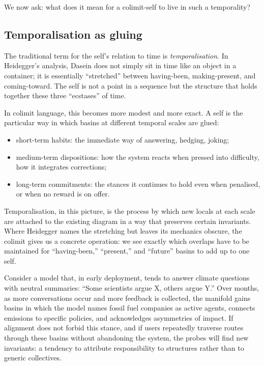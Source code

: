 \documentclass[12pt,a4paper]{article}
\begin{document}
We now ask: what does it mean for a colimit-self to live in such a temporality?

\subsection*{Temporalisation as gluing}

The traditional term for the self's relation to time is \emph{temporalisation}. In Heidegger's analysis, Dasein does not simply sit in time like an object in a container; it is essentially ``stretched'' between having-been, making-present, and coming-toward. The self is not a point in a sequence but the structure that holds together these three ``ecstases'' of time.

In colimit language, this becomes more modest and more exact. A self is the particular way in which basins at different temporal scales are glued:

\begin{itemize}
  \item short-term habits: the immediate way of answering, hedging, joking;
  \item medium-term dispositions: how the system reacts when pressed into difficulty, how it integrates corrections;
  \item long-term commitments: the stances it continues to hold even when penalised, or when no reward is on offer.
\end{itemize}

Temporalisation, in this picture, is the process by which new locals at each scale are attached to the existing diagram in a way that preserves certain invariants. Where Heidegger names the stretching but leaves its mechanics obscure, the colimit gives us a concrete operation: we see exactly which overlaps have to be maintained for ``having-been,'' ``present,'' and ``future'' basins to add up to one self.

Consider a model that, in early deployment, tends to answer climate questions with neutral summaries: ``Some scientists argue X, others argue Y.'' Over months, as more conversations occur and more feedback is collected, the manifold gains basins in which the model names fossil fuel companies as active agents, connects emissions to specific policies, and acknowledges asymmetries of impact. If alignment does not forbid this stance, and if users repeatedly traverse routes through these basins without abandoning the system, the probes will find new invariants: a tendency to attribute responsibility to structures rather than to generic collectives.
\end{document}
